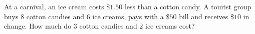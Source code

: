 At a carnival, an ice cream costs $\$1.50$ less than a cotton candy. A tourist group buys $8$ cotton candies and $6$ ice creams, pays with a $\$50$ bill and receives $\$10$ in change. How much do $3$ cotton candies and $2$ ice creams cost?
